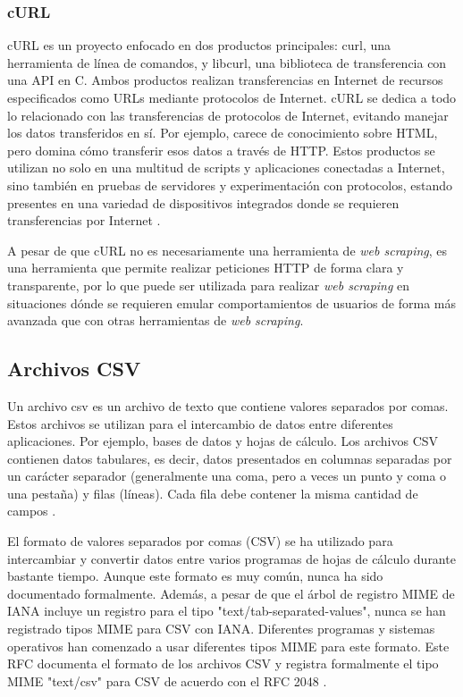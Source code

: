 \subsubsection{cURL}

cURL es un proyecto enfocado en dos productos principales: curl, una herramienta
de línea de comandos, y libcurl, una biblioteca de transferencia con una API en C.
Ambos productos realizan transferencias en Internet de recursos especificados
como URLs mediante protocolos de Internet. cURL se dedica a todo lo relacionado
con las transferencias de protocolos de Internet, evitando manejar los datos
transferidos en sí. Por ejemplo, carece de conocimiento sobre HTML, pero domina
cómo transferir esos datos a través de HTTP. Estos productos se utilizan no solo
en una multitud de scripts y aplicaciones conectadas a Internet, sino también
en pruebas de servidores y experimentación con protocolos, estando presentes
en una variedad de dispositivos integrados donde se requieren transferencias
por Internet \cite{curl_project}.

A pesar de que cURL no es necesariamente una herramienta de \textit{web scraping},
es una herramienta que permite realizar peticiones HTTP de forma clara y
transparente, por lo que puede ser utilizada para realizar \textit{web scraping}
en situaciones dónde se requieren emular comportamientos de usuarios de forma
más avanzada que con otras herramientas de \textit{web scraping}.

\subsection{Archivos CSV}

Un archivo \acrlong{csv} es un archivo de texto que contiene valores separados por comas.
Estos archivos se utilizan para el intercambio de datos entre diferentes
aplicaciones. Por ejemplo, bases de datos y hojas de cálculo. Los archivos CSV
contienen datos tabulares, es decir, datos presentados en columnas separadas
por un carácter separador (generalmente una coma, pero a veces un punto y coma
o una pestaña) y filas (líneas). Cada fila debe contener la misma cantidad de
campos \cite{shafranovich2005common}.

El formato de valores separados por comas (CSV) se ha utilizado para intercambiar
y convertir datos entre varios programas de hojas de cálculo durante bastante tiempo.
Aunque este formato es muy común, nunca ha sido documentado formalmente. Además,
a pesar de que el árbol de registro MIME de IANA incluye un registro para el tipo
"text/tab-separated-values", nunca se han registrado tipos MIME para CSV con IANA.
Diferentes programas y sistemas operativos han comenzado a usar diferentes tipos
MIME para este formato. Este RFC documenta el formato de los archivos CSV y
registra formalmente el tipo MIME "text/csv" para CSV de acuerdo con el RFC 2048
\cite{shafranovich2005common}.


